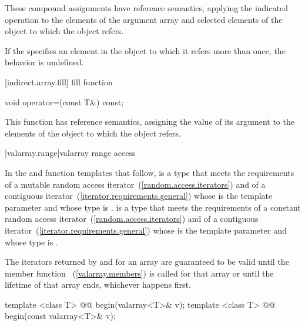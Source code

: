 \begin{itemdescr}
\pnum
These compound assignments have reference semantics, applying the indicated
operation to the elements of the argument array and selected elements of the
object to which the
object refers.

\pnum
If the
specifies an element in the
object to which it refers more than once,
the behavior is undefined.
\end{itemdescr}

[indirect.array.fill]{ fill function}

%
\begin{itemdecl}
void operator=(const T&) const;
\end{itemdecl}

\begin{itemdescr}
\pnum
This function has reference semantics, assigning the value of its argument
to the elements of the
object to which the
object refers.
\end{itemdescr}

[valarray.range]{valarray range access}

\pnum
In the  and  function templates that follow, 
is a type that meets the requirements of a mutable random access
iterator~(\ref{random.access.iterators})
and of a contiguous iterator~(\ref{iterator.requirements.general})
whose  is the template
parameter  and whose  type is .  is a
type that meets the requirements of a constant random access
iterator~(\ref{random.access.iterators})
and of a contiguous iterator~(\ref{iterator.requirements.general})
whose  is the template
parameter  and whose  type is .

\pnum
The iterators returned by  and  for an array
are guaranteed to be valid until the member function
~(\ref{valarray.members}) is called for that
array or until the lifetime of that array ends, whichever happens
first.

%
%
\begin{itemdecl}
template <class T> @@ begin(valarray<T>& v);
template <class T> @@ begin(const valarray<T>& v);
\end{itemdecl}


